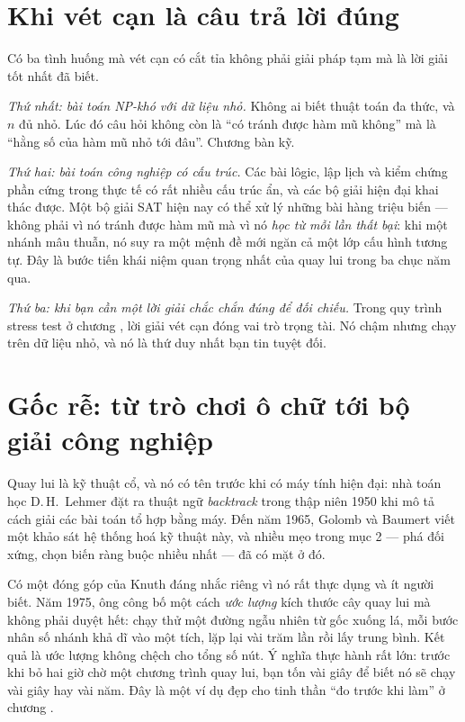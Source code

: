 \documentclass[../../algorithm.tex]{subfiles}
\begin{document}
\section{Khi vét cạn là câu trả lời đúng}

Có ba tình huống mà vét cạn có cắt tỉa không phải giải pháp tạm mà là lời giải tốt nhất đã biết.

\emph{Thứ nhất: bài toán NP-khó với dữ liệu nhỏ.} Không ai biết thuật toán đa thức, và \(n\) đủ nhỏ. Lúc đó câu hỏi không còn là ``có tránh được hàm mũ không'' mà là ``hằng số của hàm mũ nhỏ tới đâu''. Chương  bàn kỹ.

\emph{Thứ hai: bài toán công nghiệp có cấu trúc.} Các bài lôgic, lập lịch và kiểm chứng phần cứng trong thực tế có rất nhiều cấu trúc ẩn, và các bộ giải hiện đại khai thác được. Một bộ giải SAT hiện nay có thể xử lý những bài hàng triệu biến --- không phải vì nó tránh được hàm mũ mà vì nó \emph{học từ mỗi lần thất bại}: khi một nhánh mâu thuẫn, nó suy ra một mệnh đề mới ngăn cả một lớp cấu hình tương tự. Đây là bước tiến khái niệm quan trọng nhất của quay lui trong ba chục năm qua.

\emph{Thứ ba: khi bạn cần một lời giải chắc chắn đúng để đối chiếu.} Trong quy trình stress test ở chương , lời giải vét cạn đóng vai trò trọng tài. Nó chậm nhưng chạy trên dữ liệu nhỏ, và nó là thứ duy nhất bạn tin tuyệt đối.

\section{Gốc rễ: từ trò chơi ô chữ tới bộ giải công nghiệp}

Quay lui là kỹ thuật cổ, và nó có tên trước khi có máy tính hiện đại: nhà toán học D.\,H.\ Lehmer đặt ra thuật ngữ \emph{backtrack} trong thập niên 1950 khi mô tả cách giải các bài toán tổ hợp bằng máy. Đến năm 1965, Golomb và Baumert viết một khảo sát hệ thống hoá kỹ thuật này, và nhiều mẹo trong mục 2 --- phá đối xứng, chọn biến ràng buộc nhiều nhất --- đã có mặt ở đó.

Có một đóng góp của Knuth đáng nhắc riêng vì nó rất thực dụng và ít người biết. Năm 1975, ông công bố một cách \emph{ước lượng} kích thước cây quay lui mà không phải duyệt hết: chạy thử một đường ngẫu nhiên từ gốc xuống lá, mỗi bước nhân số nhánh khả dĩ vào một tích, lặp lại vài trăm lần rồi lấy trung bình. Kết quả là ước lượng không chệch cho tổng số nút. Ý nghĩa thực hành rất lớn: trước khi bỏ hai giờ chờ một chương trình quay lui, bạn tốn vài giây để biết nó sẽ chạy vài giây hay vài năm. Đây là một ví dụ đẹp cho tinh thần ``đo trước khi làm'' ở chương .
\end{document}
